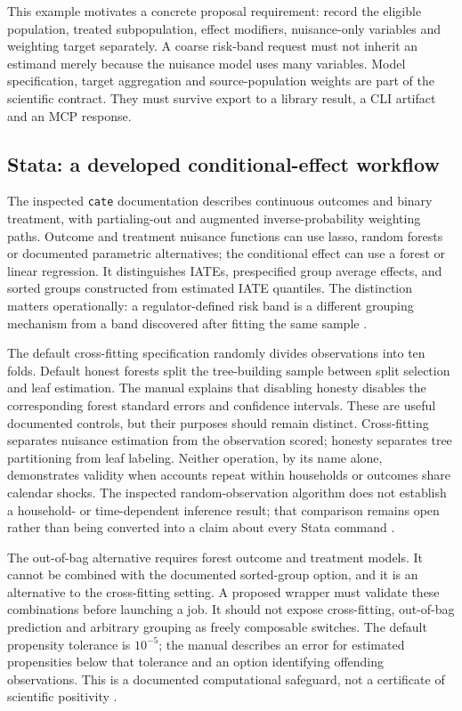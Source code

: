 This example motivates a concrete proposal requirement: record the eligible
population, treated subpopulation, effect modifiers, nuisance-only variables
and weighting target separately. A coarse risk-band request must not inherit
an estimand merely because the nuisance model uses many variables. Model
specification, target aggregation and source-population weights are part of
the scientific contract. They must survive export to a library result, a CLI
artifact and an MCP response.

\subsection{Stata: a developed conditional-effect workflow}

The inspected \texttt{cate} documentation describes continuous outcomes and
binary treatment, with partialing-out and augmented inverse-probability
weighting paths. Outcome and treatment nuisance functions can use lasso,
random forests or documented parametric alternatives; the conditional effect
can use a forest or linear regression. It distinguishes IATEs, prespecified
group average effects, and sorted groups constructed from estimated IATE
quantiles. The distinction matters operationally: a regulator-defined risk
band is a different grouping mechanism from a band discovered after fitting
the same sample \citep{exec13_ch_stata}.

The default cross-fitting specification randomly divides observations into
ten folds. Default honest forests split the tree-building sample between
split selection and leaf estimation. The manual explains that disabling
honesty disables the corresponding forest standard errors and confidence
intervals. These are useful documented controls, but their purposes should
remain distinct. Cross-fitting separates nuisance estimation from the
observation scored; honesty separates tree partitioning from leaf labeling.
Neither operation, by its name alone, demonstrates validity when accounts
repeat within households or outcomes share calendar shocks. The inspected
random-observation algorithm does not establish a household- or
time-dependent inference result; that comparison remains open rather than
being converted into a claim about every Stata command
\citep{exec13_ch_stata}.

The out-of-bag alternative requires forest outcome and treatment models.
It cannot be combined with the documented sorted-group option, and it is
an alternative to the cross-fitting setting. A proposed wrapper must
validate these combinations before launching a job. It should not expose
cross-fitting, out-of-bag prediction and arbitrary grouping as freely
composable switches. The default propensity tolerance is $10^{-5}$; the
manual describes an error for estimated propensities below that tolerance
and an option identifying offending observations. This is a documented
computational safeguard, not a certificate of scientific positivity
\citep{exec13_ch_stata}.

